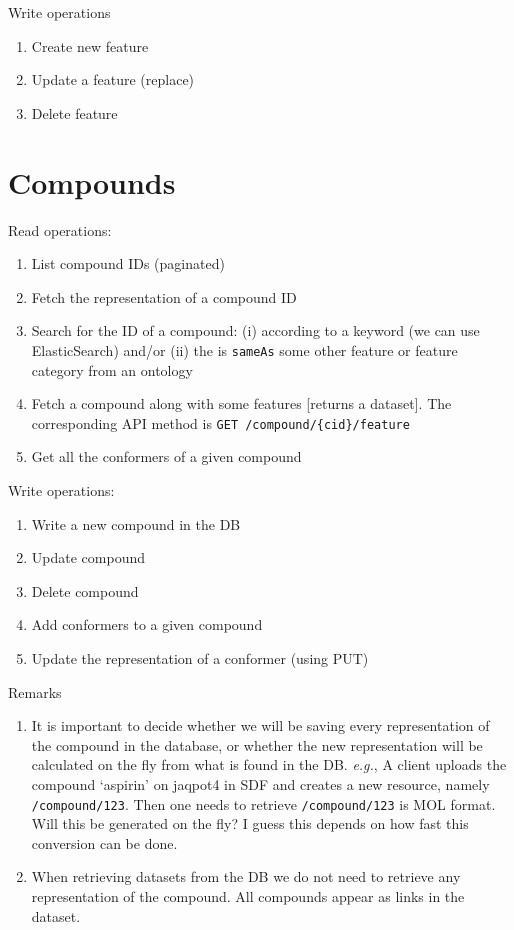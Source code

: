 \noindent Write operations
\begin{enumerate}
 \item Create new feature
 \item Update a feature (replace)
 \item Delete feature
\end{enumerate}



\section{Compounds}

\noindent Read operations:
\begin{enumerate}
 \item List compound IDs (paginated)
\item  Fetch the representation of a compound ID
\item  Search for the ID of a compound: (i) according to a keyword (we can use ElasticSearch) 
       and/or (ii) the is \texttt{sameAs} some other feature or feature category from an ontology
\item  Fetch a compound along with some features [returns a dataset]. 
   The corresponding API method is \texttt{GET /compound/\{cid\}/feature}
\item  Get all the conformers of a given compound
\end{enumerate}


\noindent Write operations:
\begin{enumerate}
\item Write a new compound in the DB
\item  Update compound
\item  Delete compound
\item  Add conformers to a given compound
\item  Update the representation of a conformer (using PUT)
\end{enumerate}


\noindent Remarks
\begin{enumerate}
\item  It is important to decide whether we will be saving every 
representation of the compound in the database, or whether the new 
representation will be calculated on the fly from what is found in the DB. 
\textit{e.g.}, A client uploads the compound ‘aspirin’ on jaqpot4 in SDF and 
creates a new resource, namely \texttt{/compound/123}. 
Then one needs to retrieve \texttt{/compound/123} is MOL format. 
Will this be generated on the fly? I guess this depends on how fast 
this conversion can be done. 
\item When retrieving datasets from the DB we do not need to 
retrieve any representation of the compound. All compounds appear as links in the dataset.
\end{enumerate}




